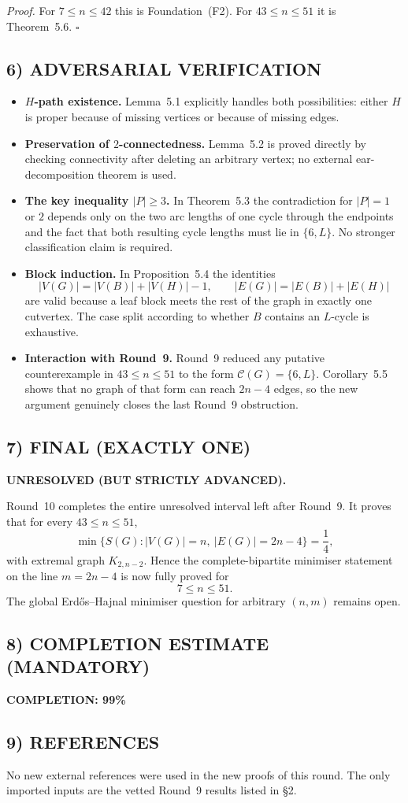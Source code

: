 \medskip
\textit{Proof.}
For $7\le n\le 42$ this is Foundation~(F2). For $43\le n\le 51$ it is Theorem~5.6.
\hfill$\square$

\subsection*{6) ADVERSARIAL VERIFICATION}

\begin{itemize}
\item \textbf{$H$-path existence.} Lemma~5.1 explicitly handles both possibilities: either $H$ is proper because of missing vertices or because of missing edges.

\item \textbf{Preservation of $2$-connectedness.} Lemma~5.2 is proved directly by checking connectivity after deleting an arbitrary vertex; no external ear-decomposition theorem is used.

\item \textbf{The key inequality $|P|\ge 3$.} In Theorem~5.3 the contradiction for $|P|=1$ or $2$ depends only on the two arc lengths of one cycle through the endpoints and the fact that both resulting cycle lengths must lie in $\{6,L\}$. No stronger classification claim is required.

\item \textbf{Block induction.} In Proposition~5.4 the identities
\[
|V(G)|=|V(B)|+|V(H)|-1,
\qquad
|E(G)|=|E(B)|+|E(H)|
\]
are valid because a leaf block meets the rest of the graph in exactly one cutvertex. The case split according to whether $B$ contains an $L$-cycle is exhaustive.

\item \textbf{Interaction with Round~9.} Round~9 reduced any putative counterexample in $43\le n\le 51$ to the form $\mathcal C(G)=\{6,L\}$. Corollary~5.5 shows that no graph of that form can reach $2n-4$ edges, so the new argument genuinely closes the last Round~9 obstruction.
\end{itemize}

\subsection*{7) FINAL (EXACTLY ONE)}

\textbf{UNRESOLVED (BUT STRICTLY ADVANCED).}

Round~10 completes the entire unresolved interval left after Round~9. It proves that for every $43\le n\le 51$,
\[
\min\{S(G): |V(G)|=n,\ |E(G)|=2n-4\}=\frac14,
\]
with extremal graph $K_{2,n-2}$.
Hence the complete-bipartite minimiser statement on the line $m=2n-4$ is now fully proved for
\[
7\le n\le 51.
\]
The global Erd\H{o}s--Hajnal minimiser question for arbitrary $(n,m)$ remains open.

\subsection*{8) COMPLETION ESTIMATE (MANDATORY)}

\textbf{COMPLETION: 99\%}

\subsection*{9) REFERENCES}

No new external references were used in the new proofs of this round. The only imported inputs are the vetted Round~9 results listed in \S2.
